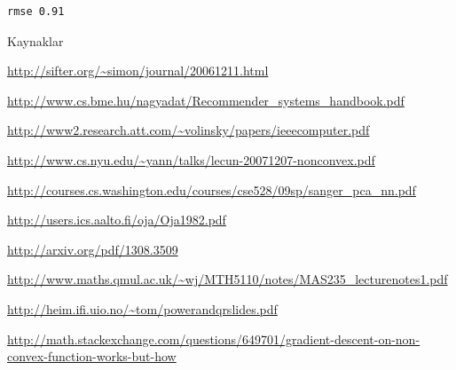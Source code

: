 \documentclass[12pt,fleqn]{article}\usepackage{../common}
\begin{document}
\begin{verbatim}
rmse 0.91
\end{verbatim}










Kaynaklar

\url{http://sifter.org/~simon/journal/20061211.html}

\url{http://www.cs.bme.hu/nagyadat/Recommender_systems_handbook.pdf}

\url{http://www2.research.att.com/~volinsky/papers/ieeecomputer.pdf}

\url{http://www.cs.nyu.edu/~yann/talks/lecun-20071207-nonconvex.pdf}

\url{http://courses.cs.washington.edu/courses/cse528/09sp/sanger_pca_nn.pdf}

\url{http://users.ics.aalto.fi/oja/Oja1982.pdf}

\url{http://arxiv.org/pdf/1308.3509}

\url{http://www.maths.qmul.ac.uk/~wj/MTH5110/notes/MAS235_lecturenotes1.pdf}

\url{http://heim.ifi.uio.no/~tom/powerandqrslides.pdf}

\url{http://math.stackexchange.com/questions/649701/gradient-descent-on-non-convex-function-works-but-how}
\end{document}
